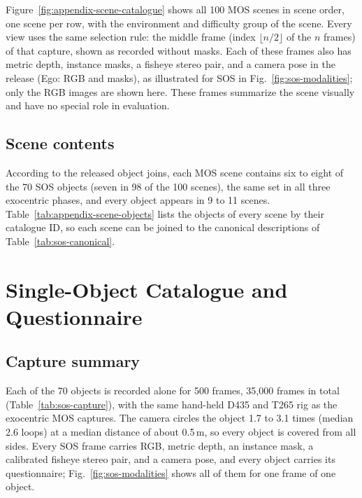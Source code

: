 Figure~\ref{fig:appendix-scene-catalogue} shows all 100 MOS scenes in scene order, one scene per row, with the environment and difficulty group of the scene. Every view uses the same selection rule: the middle frame (index $\lfloor n/2\rfloor$ of the $n$ frames) of that capture, shown as recorded without masks. Each of these frames also has metric depth, instance masks, a fisheye stereo pair, and a camera pose in the release (Ego: RGB and masks), as illustrated for SOS in Fig.~\ref{fig:sos-modalities}; only the RGB images are shown here. These frames summarize the scene visually and have no special role in evaluation.



\subsection{Scene contents}

According to the released object joins, each MOS scene contains six to eight of the 70 SOS objects (seven in 98 of the 100 scenes), the same set in all three exocentric phases, and every object appears in 9 to 11 scenes. Table~\ref{tab:appendix-scene-objects} lists the objects of every scene by their catalogue ID, so each scene can be joined to the canonical descriptions of Table~\ref{tab:sos-canonical}.

\rawneed{4cm}


\section{Single-Object Catalogue and Questionnaire}
\label{sec:appendix-sos}

\subsection{Capture summary}

Each of the 70 objects is recorded alone for 500 frames, 35,000 frames in total (Table~\ref{tab:sos-capture}), with the same hand-held D435 and T265 rig as the exocentric MOS captures. The camera circles the object 1.7 to 3.1 times (median 2.6 loops) at a median distance of about 0.5\,m, so every object is covered from all sides. Every SOS frame carries RGB, metric depth, an instance mask, a calibrated fisheye stereo pair, and a camera pose, and every object carries its questionnaire; Fig.~\ref{fig:sos-modalities} shows all of them for one frame of one object.

